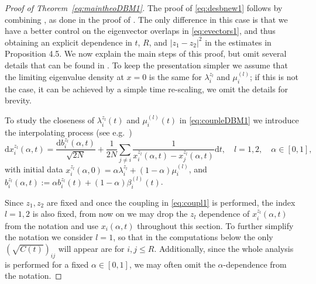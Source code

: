 \documentclass[10pt]{amsart}
\numberwithin{equation}{section}
\newcommand{\rd}{\mathrm{d}}
\begin{document}
\begin{proof}[Proof of Theorem~\ref{eq:maintheoDBM1}]
The proof of \eqref{eq:desbnew1} follows by combining \cite[Proposition~4.5,4.6]{bourgade2024fluctuations}, as done in the proof of \cite[Theorem~4.1]{bourgade2024fluctuations}. The only difference in this case is that we have a better control on the eigenvector overlaps in \eqref{eq:evectors1}, and thus obtaining an explicit dependence in $t$, $R$, and $|z_1-z_2|^2$ in the estimates in Proposition 4.5. We now explain the main steps of this proof, but omit several details that can be found in \cite{bourgade2024fluctuations}. To keep the presentation simpler we assume that the limiting eigenvalue density at $x=0$ is the same for $\lambda_i^{z_l}$ and $\mu_i^{(l)}$; if this is not the case, it can be achieved by a simple time re-scaling, we omit the details for brevity.

To study the closeness of $\lambda_i^{z_l}(t)$ and $\mu_i^{(l)}(t)$ in \eqref{eq:coupleDBM1} we introduce the interpolating process (see e.g.~\cite{fixed_E}) 
\begin{equation}
\label{eq:interdbm1}
\rd x_i^{z_l}(\alpha, t)=\frac{\rd b_i^{z_l}(\alpha,t)}{\sqrt{2N}}+\frac{1}{2N}\sum_{j\ne i}\frac{1}{x_i^{z_l}(\alpha, t)-x_j^{z_l}(\alpha, t)}\rd t,
\quad l=1,2, \quad \alpha\in [0,1],
\end{equation}
with initial data $x_i^{z_l}(\alpha, 0)=\alpha\lambda_i^{z_l}+(1-\alpha)\mu_i^{(l)}$, and $b_i^{z_l}(\alpha,t):=\alpha b_i^{z_l}(t)+(1-\alpha)\beta_i^{(l)}(t)$.

Since $z_1,z_2$ are fixed  and once the coupling in \eqref{eq:coupl1} is performed,
the index $l=1,2$ is also fixed, from now on we may drop the $z_l$ dependence of $x_i^{z_l}(\alpha, t)$ from the notation and use $x_i(\alpha, t)$ throughout this section. To further simplify the notation we consider $l=1$, so that in the computations below the only $(\sqrt{C(t)})_{ij}$ will appear are for $i,j\le R$. Additionally, since the whole analysis is performed for a fixed $\alpha\in [0,1]$, we may often omit the $\alpha$-dependence from the notation. 


\end{proof}
\end{document}
